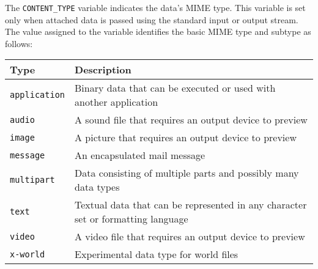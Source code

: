 \begin{description}
The \verb|CONTENT_TYPE| variable indicates the data's MIME type. This
variable is set only when attached data is passed using the standard input
or output stream. The value assigned to the variable identifies the basic MIME
type and subtype as follows:
\begin{center}
\begin{longtable}{|l|p{10cm}|}
\hline
{\bf Type} & {\bf Description}\\
\hline
\verb|application| & Binary data that can be executed or used with another 
application\\\hline
\verb|audio| & A sound file that requires an output device to preview\\\hline
\verb|image| & A picture that requires an output device to preview\\\hline
\verb|message| & An encapsulated mail message\\\hline
\verb|multipart| & Data consisting of multiple parts and possibly many data 
types\\\hline
\verb|text| & Textual data that can be represented in any character set or formatting language\\\hline
\verb|video| & A video file that requires an output device to preview\\\hline
\verb|x-world|   & Experimental data type for world files\\\hline
\end{longtable}
\end{center}


\end{description}
